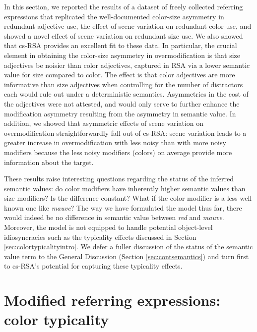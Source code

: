 \documentclass[11pt]{article}
\newcommand{\jd}[1]{\textcolor{Red}{[jd: #1]}}
\newcommand{\sectionref}[1]{Section \ref{#1}}
\begin{document}
In this section, we reported the results of a dataset of freely collected referring expressions that replicated the well-documented color-size asymmetry in redundant adjective use, the effect of scene variation on redundant color use, and showed a novel effect of scene variation on redundant size use. We also showed that cs-RSA provides an excellent fit to these data. In particular, the crucial element in obtaining the color-size asymmetry in overmodification is that size adjectives be noisier than  color adjectives, captured in RSA via a lower semantic value for size compared to color. The effect is that color adjectives are more informative than size adjectives when controlling for the number of distractors each would rule out under a deterministic semantics. Asymmetries in the cost of the adjectives were not attested, and would only serve to further enhance the modification asymmetry resulting from the asymmetry in semantic value. In addition, we showed that asymmetric effects of scene variation on overmodification straightforwardly fall out of cs-RSA: scene variation leads to a greater increase in overmodification with less noisy than with more noisy modifiers because the less noisy modifiers (colors) on average provide more information about the target.

These results raise interesting questions regarding the status of the inferred semantic values: do color modifiers have inherently higher semantic values than size modifiers? Is the difference constant? What if the color modifier is a less well known one like \emph{mauve}? The way we have formulated the model thus far, there would indeed be no difference in semantic value between \emph{red} and \emph{mauve}. Moreover, the model is not equipped to handle potential object-level idiosyncracies such as the typicality effects discussed in \sectionref{sec:colortypicalityintro}. We defer a fuller discussion of the status of the semantic value term to the General Discussion (\sectionref{sec:contsemantics}) and turn first to cs-RSA's potential for capturing these typicality effects.


\section[]{Modified referring expressions: color typicality}
\label{sec:colortypicality}
\end{document}
